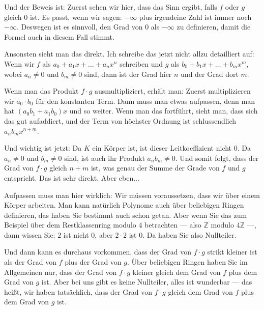 
\begin{spoken-clean}[00:13:35 - 00:15:00]
Und der Beweis ist: Zuerst sehen wir hier, dass das Sinn ergibt, falls $f$ oder $g$ gleich $0$ ist. Es passt, wenn wir sagen: $-\infty$ plus irgendeine Zahl ist immer noch $-\infty$. Deswegen ist es sinnvoll, den Grad von $0$ als $-\infty$ zu definieren, damit die Formel auch in diesem Fall stimmt.

Ansonsten sieht man das direkt. Ich schreibe das jetzt nicht allzu detailliert auf: Wenn wir $f$ als $a_0 + a_1 x + \dots + a_n x^n$ schreiben und $g$ als $b_0 + b_1 x + \dots + b_m x^m$, wobei $a_n \neq 0$ und $b_m \neq 0$ sind, dann ist der Grad hier $n$ und der Grad dort $m$.

Wenn man das Produkt $f \cdot g$ ausmultipliziert, erhält man: Zuerst multiplizieren wir $a_0 \cdot b_0$ für den konstanten Term. Dann muss man etwas aufpassen, denn man hat $(a_0 b_1 + a_1 b_0) x$ und so weiter. Wenn man das fortführt, sieht man, dass sich das gut aufaddiert, und der Term von höchster Ordnung ist schlussendlich $a_n b_m x^{n+m}$.

Und wichtig ist jetzt: Da $K$ ein Körper ist, ist dieser Leitkoeffizient nicht $0$. Da $a_n \neq 0$ und $b_m \neq 0$ sind, ist auch ihr Produkt $a_n b_m \neq 0$. Und somit folgt, dass der Grad von $f \cdot g$ gleich $n + m$ ist, was genau der Summe der Grade von $f$ und $g$ entspricht. Das ist sehr direkt. Aber eben...
\end{spoken-clean}

\begin{spoken-clean}[00:15:00 - 00:18:00]
Aufpassen muss man hier wirklich: Wir müssen voraussetzen, dass wir über einem Körper arbeiten. Man kann natürlich Polynome auch über beliebigen Ringen definieren, das haben Sie bestimmt auch schon getan. Aber wenn Sie das zum Beispiel über dem Restklassenring modulo $4$ betrachten --- also $\mathbb{Z}$ modulo $4\mathbb{Z}$ ---, dann wissen Sie: $2$ ist nicht $0$, aber $2 \cdot 2$ ist $0$. Da haben Sie also Nullteiler.

Und dann kann es durchaus vorkommen, dass der Grad von $f \cdot g$ strikt kleiner ist als der Grad von $f$ plus der Grad von $g$. Über beliebigen Ringen haben Sie im Allgemeinen nur, dass der Grad von $f \cdot g$ kleiner gleich dem Grad von $f$ plus dem Grad von $g$ ist. Aber bei uns gibt es keine Nullteiler, alles ist wunderbar --- das heißt, wir haben tatsächlich, dass der Grad von $f \cdot g$ gleich dem Grad von $f$ plus dem Grad von $g$ ist.
\end{spoken-clean}

